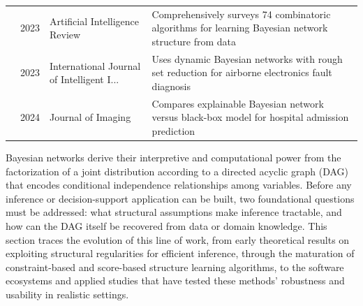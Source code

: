 \begin{table}[!t]
\begin{tabularx}{\textwidth}{@{}l c p{3.6cm} X@{}}
\cite{kitson2023survey} & 2023 & Artificial Intelligence Review & Comprehensively surveys 74 combinatoric algorithms for learning Bayesian network structure from data \\
\cite{chen2023fault} & 2023 & International Journal of Intelligent I... & Uses dynamic Bayesian networks with rough set reduction for airborne electronics fault diagnosis \\
\cite{nicora2024bayesian} & 2024 & Journal of Imaging & Compares explainable Bayesian network versus black-box model for hospital admission prediction \\
\bottomrule
\end{tabularx}
\end{table}

Bayesian networks derive their interpretive and computational power from the factorization of a joint distribution according to a directed acyclic graph (DAG) that encodes conditional independence relationships among variables. Before any inference or decision-support application can be built, two foundational questions must be addressed: what structural assumptions make inference tractable, and how can the DAG itself be recovered from data or domain knowledge. This section traces the evolution of this line of work, from early theoretical results on exploiting structural regularities for efficient inference, through the maturation of constraint-based and score-based structure learning algorithms, to the software ecosystems and applied studies that have tested these methods' robustness and usability in realistic settings.

